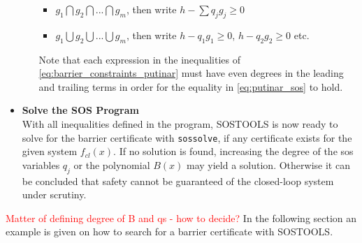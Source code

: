 \begin{itemize}
\begin{itemize}
		\begin{itemize}
			\item $g_1 \bigcap g_2 \bigcap ... \bigcap g_m$, then write $h - \sum q_jg_j\geq 0$
			\item $g_1 \bigcup g_2 \bigcup ... \bigcup g_m$, then write $h - q_1g_1\geq 0$, $h - q_2g_2\geq 0$ etc.
		\end{itemize} 
		Note that each expression in the inequalities of \autoref{eq:barrier_constraints_putinar} must have even degrees in the leading and trailing terms in order for the equality in \autoref{eq:putinar_sos} to hold.
	\end{itemize}
	\item \textbf{Solve the SOS Program}\\
	With all inequalities defined in the program, SOSTOOLS is now ready to solve for the barrier certificate with \texttt{sossolve}, if any certificate exists for the given system $f_{cl}(x)$. If no solution is found, increasing the degree of the \gls{sos} variables $q_j$ or the polynomial $B(x)$ may yield a solution. Otherwise it can be concluded that safety cannot be guaranteed of the closed-loop system under scrutiny. 
\end{itemize}





\textcolor{red}{Matter of defining degree of B and qs - how to decide?}
In the following section an example is given on how to search for a barrier certificate with SOSTOOLS.











